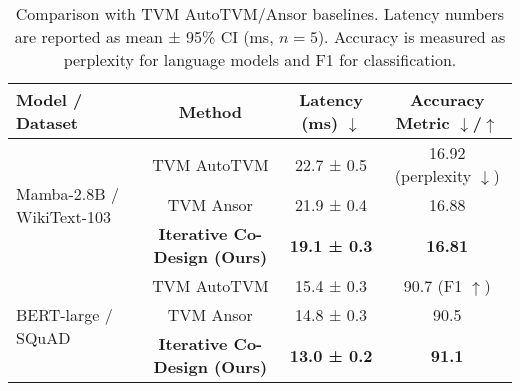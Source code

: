 \begin{table}[hbt!]
    \centering
    \caption{Comparison with TVM AutoTVM/Ansor baselines. Latency numbers are reported as mean ± 95\% CI (ms, $n=5$). Accuracy is measured as perplexity for language models and F1 for classification.}
    \label{tab:tvm_baseline}
    \begin{tabular}{l c c c}
        \toprule
        \textbf{Model / Dataset} & \textbf{Method} & \textbf{Latency (ms)} $\downarrow$ & \textbf{Accuracy Metric} $\downarrow$/$\uparrow$ \\
        \midrule
        \multirow{3}{*}{Mamba-2.8B / WikiText-103} & TVM AutoTVM & 22.7 ± 0.5 & 16.92 (perplexity $\downarrow$) \\
        & TVM Ansor & 21.9 ± 0.4 & 16.88 \\
        & \textbf{Iterative Co-Design (Ours)} & \textbf{19.1 ± 0.3} & \textbf{16.81} \\
        \midrule
        \multirow{3}{*}{BERT-large / SQuAD} & TVM AutoTVM & 15.4 ± 0.3 & 90.7 (F1 $\uparrow$) \\
        & TVM Ansor & 14.8 ± 0.3 & 90.5 \\
        & \textbf{Iterative Co-Design (Ours)} & \textbf{13.0 ± 0.2} & \textbf{91.1} \\
        \bottomrule
    \end{tabular}
\end{table}
